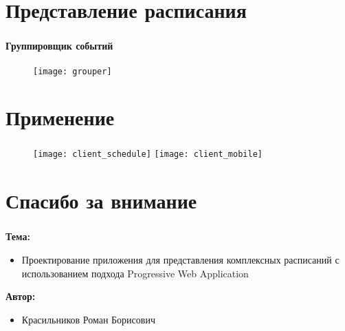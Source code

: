
\section{Представление расписания}

\begin{frame}
\frametitle{\insertsection}
\framesubtitle{Группировщик событий}

\vspace{1cm}

\begin{figure}
    \center
    \texttt{[image: grouper]}
\end{figure}
\end{frame}


\section{Применение}

\begin{frame}
\frametitle{\insertsection}

\begin{figure}[!htb]
        \texttt{[image: client\_schedule]}
    \endminipage\hfill
        \texttt{[image: client\_mobile]}
    \endminipage
\end{figure}

\end{frame}


\section{Спасибо за внимание}

\begin{frame}
    \frametitle{\insertsection}

    \textbf{Тема:}
    \begin{itemize}
        \item Проектирование приложения для представления комплексных расписаний с использованием подхода Progressive Web Application
    \end{itemize}

    \textbf{Автор:}
    \begin{itemize}
        \item Красильников Роман Борисович
    \end{itemize}

\end{frame}
